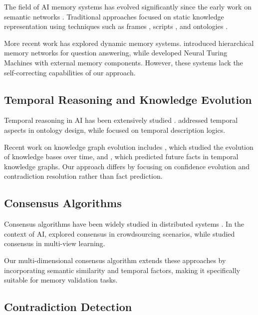 \documentclass[12pt,a4paper]{article}
\begin{document}
The field of AI memory systems has evolved significantly since the early work on semantic networks \cite{quillian1968semantic}. Traditional approaches focused on static knowledge representation using techniques such as frames \cite{minsky1974framework}, scripts \cite{schank1977scripts}, and ontologies \cite{gruber1993translation}.

More recent work has explored dynamic memory systems. \cite{ahn2016hierarchical} introduced hierarchical memory networks for question answering, while \cite{graves2014neural} developed Neural Turing Machines with external memory components. However, these systems lack the self-correcting capabilities of our approach.

\subsection{Temporal Reasoning and Knowledge Evolution}

Temporal reasoning in AI has been extensively studied \cite{allen1983maintaining, vila1994survey}. \cite{welty2006temporal} addressed temporal aspects in ontology design, while \cite{artale2014temporal} focused on temporal description logics.

Recent work on knowledge graph evolution includes \cite{leblay2018deriving}, which studied the evolution of knowledge bases over time, and \cite{trivedi2017know}, which predicted future facts in temporal knowledge graphs. Our approach differs by focusing on confidence evolution and contradiction resolution rather than fact prediction.

\subsection{Consensus Algorithms}

Consensus algorithms have been widely studied in distributed systems \cite{lamport1998part, castro1999practical}. In the context of AI, \cite{raykar2010learning} explored consensus in crowdsourcing scenarios, while \cite{zhang2014spectral} studied consensus in multi-view learning.

Our multi-dimensional consensus algorithm extends these approaches by incorporating semantic similarity and temporal factors, making it specifically suitable for memory validation tasks.

\subsection{Contradiction Detection}
\end{document}
